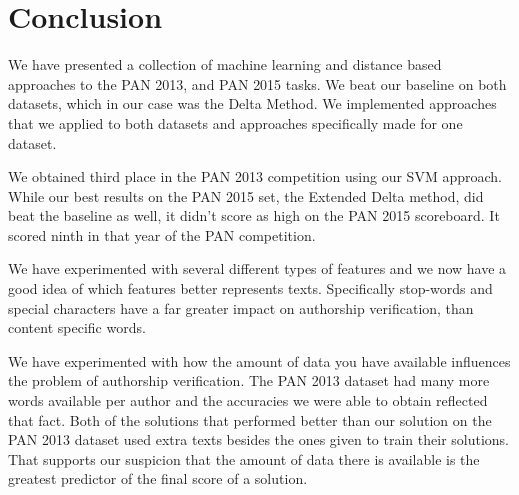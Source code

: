 \section{Conclusion} \label{sec:conclusion}

We have presented a collection of machine learning and distance based approaches
to the PAN 2013, and PAN 2015 tasks. We beat our baseline on both datasets,
which in our case was the Delta Method. We implemented approaches that we
applied to both datasets and approaches specifically made for one dataset.

We obtained third place in the PAN 2013 competition using our \gls{SVM}
approach. While our best results on the PAN 2015 set, the Extended Delta
method, did beat the baseline as well, it didn't score as high on the PAN 2015
scoreboard. It scored ninth in that year of the PAN competition.

We have experimented with several different types of features and we now have
a good idea of which features better represents texts. Specifically stop-words
and special characters have a far greater impact on authorship verification,
than content specific words.

We have experimented with how the amount of data you have available influences
the problem of authorship verification. The PAN 2013 dataset had many more words
available per author and the accuracies we were able to obtain reflected that
fact. Both of the solutions that performed better than our solution on the PAN
2013 dataset used extra texts besides the ones given to train their solutions.
That supports our suspicion that the amount of data there is available
is the greatest predictor of the final score of a solution.
